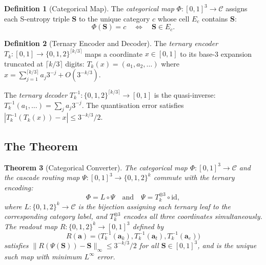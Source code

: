 \documentclass[11pt,twocolumn,a4paper]{article}
\newtheorem{theorem}{Theorem}[section]
\theoremstyle{definition}
\newtheorem{definition}[theorem]{Definition}
\theoremstyle{remark}
\newcommand{\Sent}{\bm{S}}
\begin{document}
\begin{definition}[Categorical Map]
\label{def:catmap}
The \emph{categorical map} $\Phi: [0,1]^3 \to \mathcal{C}$ assigns each
S-entropy triple $\Sent$ to the unique category $c$ whose cell $E_c$ contains
$\Sent$:
\begin{equation}
\Phi(\Sent) = c \quad \iff \quad \Sent \in E_c.
\label{eq:catmap}
\end{equation}
\end{definition}

\begin{definition}[Ternary Encoder and Decoder]
\label{def:codec}
The \emph{ternary encoder} $T_k: [0,1] \to \{0,1,2\}^{\lceil k/3 \rceil}$
maps a coordinate $x \in [0,1]$ to its base-3 expansion truncated at
$\lceil k/3 \rceil$ digits:
$T_k(x) = (a_1, a_2, \ldots)$ where $x = \sum_{j=1}^{\lceil k/3 \rceil} a_j 3^{-j}
+ O(3^{-k/3})$.

The \emph{ternary decoder} $T_k^{-1}: \{0,1,2\}^{\lceil k/3 \rceil} \to [0,1]$
is the quasi-inverse: $T_k^{-1}(a_1, \ldots) = \sum_j a_j 3^{-j}$.
The quantisation error satisfies
$|T_k^{-1}(T_k(x)) - x| \leq 3^{-k/3}/2$.
\end{definition}

\subsection{The Theorem}

\begin{theorem}[Categorical Converter]
\label{thm:catconv}
The categorical map $\Phi: [0,1]^3 \to \mathcal{C}$ and the cascade routing map
$\Psi: [0,1]^3 \to \{0,1,2\}^k$ commute with the ternary encoding:
\begin{equation}
\Phi = L \circ \Psi \quad \mathrm{and} \quad \Psi = T_k^{\otimes 3} \circ \mathrm{id},
\label{eq:commute}
\end{equation}
where $L: \{0,1,2\}^k \to \mathcal{C}$ is the bijection assigning each ternary
leaf to the corresponding category label, and $T_k^{\otimes 3}$ encodes all three
coordinates simultaneously. The readout map $R: \{0,1,2\}^k \to [0,1]^3$ defined by
\begin{equation}
R(\mathbf{a}) = \bigl(T_k^{-1}(\mathbf{a}_k), T_k^{-1}(\mathbf{a}_t),
T_k^{-1}(\mathbf{a}_e)\bigr)
\label{eq:readout}
\end{equation}
satisfies $\|R(\Psi(\Sent)) - \Sent\|_\infty \leq 3^{-k/3}/2$ for all
$\Sent \in [0,1]^3$, and is the unique such map with minimum $L^\infty$ error.
\end{theorem}
\end{document}
